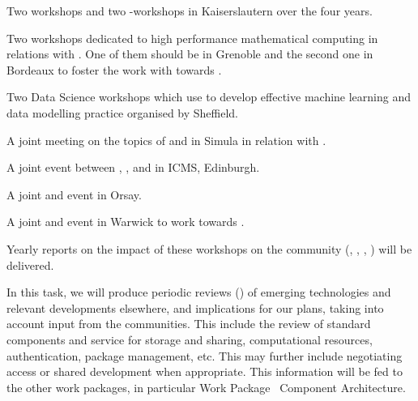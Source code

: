 \begin{workpackage}
\begin{tasklist}
\begin{task}[title=Community Building: Development Workshops, lead=PS,PM=24, partners={UB,UK,SR,SA,USH,UG}, id=devel-workshops, wphases=0-48, issue=26]
\begin{compactitem}
\item Two \Singular workshops and two \GAP-\Singular workshops in Kaiserslautern
  over the four years.

\item Two workshops dedicated to high performance mathematical
  computing in relations with . One of them should be in
  Grenoble and the second one in Bordeaux to foster the work with
  \Pari towards .

\item Two Data Science workshops which use \TheProject to develop effective machine learning and data modelling practice organised by Sheffield.

\item A joint meeting on the topics of \SMC and \Jupyter in Simula in
  relation with .

\item A joint event between \GAP, \Sage, and \Singular in ICMS,
  Edinburgh.

\item A joint \Jupyter and \Sage event in Orsay.

\item A joint \LMFDB and \Sage event in Warwick to work towards
  .

\end{compactitem}

Yearly reports on the impact of these workshops on the community (,
, ,
) will be delivered.
\end{task}


\begin{task}[title=Reviewing emerging technologies, id=tech-review, lead=PS, partners={SA,USO,USH,US,UV,UB,SR,XFEL},PM=10, wphases=0-48,issue=27]
  In this task, we will produce periodic reviews () of emerging
  technologies and relevant developments elsewhere, and implications
  for our plans, taking into account input from the communities. This
  include the review of standard components and service for storage
  and sharing, computational resources, authentication, package
  management, etc. This may further include negotiating access or
  shared development when appropriate. This information will be fed to
  the other work packages, in particular Work
  Package~ Component Architecture.
\end{task}



\end{tasklist}
\end{workpackage}
